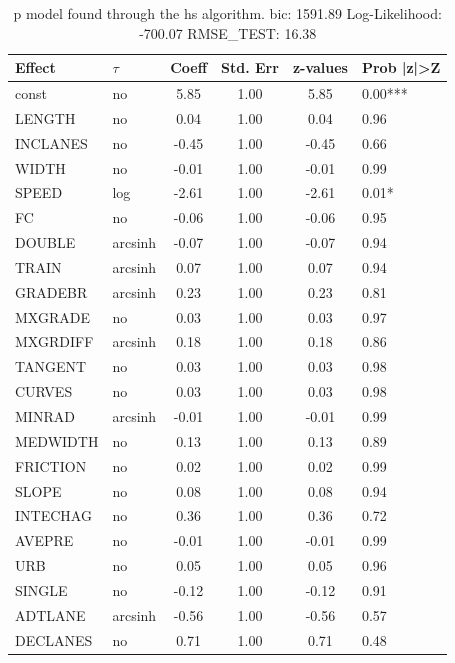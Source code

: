 \begin{table}
	\caption{p model found through the hs algorithm. bic: 1591.89 Log-Likelihood: -700.07 RMSE_TEST: 16.38}
	\begin{center}
		\begin{tabular}{|l|l|c|c|c|l|}
			\hline
			Effect & $\tau$ & Coeff & Std. Err & z-values & Prob |z|>Z \\
			\hline
			const & no & 5.85 & 1.00 & 5.85 & 0.00*** \\
			\hline
			LENGTH & no & 0.04 & 1.00 & 0.04 & 0.96 \\
			\hline
			INCLANES & no & -0.45 & 1.00 & -0.45 & 0.66 \\
			\hline
			WIDTH & no & -0.01 & 1.00 & -0.01 & 0.99 \\
			\hline
			SPEED & log & -2.61 & 1.00 & -2.61 & 0.01* \\
			\hline
			FC & no & -0.06 & 1.00 & -0.06 & 0.95 \\
			\hline
			DOUBLE & arcsinh & -0.07 & 1.00 & -0.07 & 0.94 \\
			\hline
			TRAIN & arcsinh & 0.07 & 1.00 & 0.07 & 0.94 \\
			\hline
			GRADEBR & arcsinh & 0.23 & 1.00 & 0.23 & 0.81 \\
			\hline
			MXGRADE & no & 0.03 & 1.00 & 0.03 & 0.97 \\
			\hline
			MXGRDIFF & arcsinh & 0.18 & 1.00 & 0.18 & 0.86 \\
			\hline
			TANGENT & no & 0.03 & 1.00 & 0.03 & 0.98 \\
			\hline
			CURVES & no & 0.03 & 1.00 & 0.03 & 0.98 \\
			\hline
			MINRAD & arcsinh & -0.01 & 1.00 & -0.01 & 0.99 \\
			\hline
			MEDWIDTH & no & 0.13 & 1.00 & 0.13 & 0.89 \\
			\hline
			FRICTION & no & 0.02 & 1.00 & 0.02 & 0.99 \\
			\hline
			SLOPE & no & 0.08 & 1.00 & 0.08 & 0.94 \\
			\hline
			INTECHAG & no & 0.36 & 1.00 & 0.36 & 0.72 \\
			\hline
			AVEPRE & no & -0.01 & 1.00 & -0.01 & 0.99 \\
			\hline
			URB & no & 0.05 & 1.00 & 0.05 & 0.96 \\
			\hline
			SINGLE & no & -0.12 & 1.00 & -0.12 & 0.91 \\
			\hline
			ADTLANE & arcsinh & -0.56 & 1.00 & -0.56 & 0.57 \\
			\hline
			DECLANES & no & 0.71 & 1.00 & 0.71 & 0.48 \\

\end{tabular}
\end{center}
\end{table}
